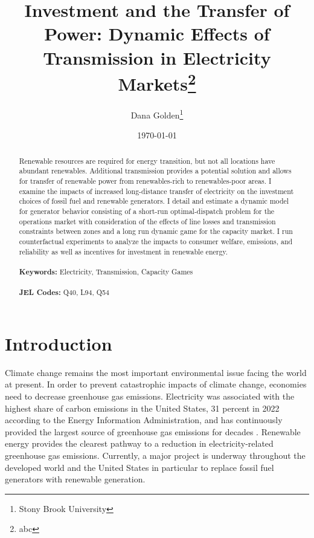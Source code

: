 \documentclass[12pt]{article}
\begin{document}
\begin{titlepage}
\title{Investment and the Transfer of Power: Dynamic Effects of Transmission in Electricity Markets\thanks{abc}}
\author{Dana Golden\thanks{Stony Brook University}}
\date{\today}
\maketitle
\begin{abstract}
\noindent Renewable resources are required for energy transition, but not all locations have abundant renewables. Additional transmission provides a potential solution and allows for transfer of renewable power from renewables-rich to renewables-poor areas. I examine the impacts of increased long-distance transfer of electricity on the investment choices of fossil fuel and renewable generators. I detail and estimate a dynamic model for generator behavior consisting of a short-run optimal-dispatch problem for the operations market with consideration of the effects of line losses and transmission constraints between zones and a long run dynamic game for the capacity market. I run counterfactual experiments to analyze the impacts to consumer welfare, emissions, and reliability as well as incentives for investment in renewable energy.\\
\vspace{0in}\\
\noindent\textbf{Keywords:} Electricity, Transmission, Capacity Games\\
\vspace{0in}\\
\noindent\textbf{JEL Codes:} Q40, L94, Q54\\

\bigskip
\end{abstract}
\setcounter{page}{0}
\thispagestyle{empty}
\end{titlepage}
\pagebreak \newpage




\doublespacing


\section{Introduction} \label{sec:introduction}

Climate change remains the most important environmental issue facing the world at present. In order to prevent catastrophic impacts of climate change, economies need to decrease greenhouse gas emissions. Electricity was associated with the highest share of carbon emissions in the United States, 31 percent in 2022 according to the Energy Information Administration, and has continuously provided the largest source of greenhouse gas emissions for decades \autocite{EIAReport}. Renewable energy provides the clearest pathway to a reduction in electricity-related greenhouse gas emissions. Currently, a major project is underway throughout the developed world and the United States in particular to replace fossil fuel generators with renewable generation.
\end{document}
